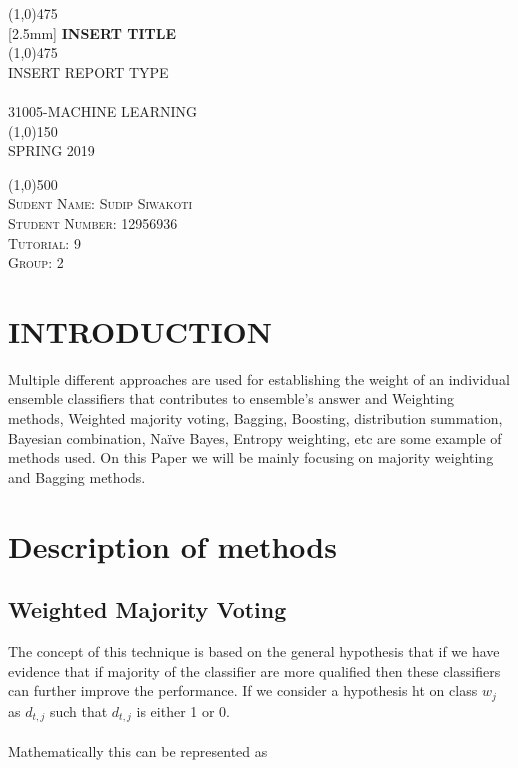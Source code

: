 \documentclass{article}
\begin{document}
\begin{titlepage}
	\begin{center}
    \line(1,0){475}\\
   [2.5mm]
    \huge{\bfseries INSERT TITLE}\\
    \line(1,0){475}\\
    [3mm]
    \textsc{\Large INSERT REPORT TYPE}\\
    [6cm]
    \textsc{\small \\
    [1mm]
    31005-MACHINE LEARNING\\
    \line(1,0){150}\\
    SPRING 2019}\\
    [6.cm]
    \end{center}
    \begin{flushleft}
    \line(1,0){500}\\
    \textsc{\large Sudent Name: Sudip Siwakoti \\Student Number: 12956936\\ Tutorial: 9 \\ Group: 2 }
    \end{flushleft}
    \lipsum[0]
\end{titlepage}
\tableofcontents
\thispagestyle{empty}
\cleardoublepage
\setcounter{page}{1}

\section{INTRODUCTION}\label{sec:intor}


Multiple different approaches are used for establishing the weight of an individual ensemble classifiers that contributes to ensemble’s answer and Weighting methods, Weighted majority voting, Bagging, Boosting, distribution summation, Bayesian combination, Naïve Bayes, Entropy weighting, etc are some example of methods used. On this Paper we will be mainly focusing on majority weighting and Bagging methods.
\section{Description of methods}
\subsection{Weighted Majority Voting}\label{SEC:Methods }
The concept of this technique is based on the general hypothesis that if we have evidence that if majority of the classifier are more qualified then these classifiers can further improve the performance. If we consider a hypothesis ht on class $w_j$ as $d_{t,j}$ such that $d_{t,j}$ is either 1 or 0.\\
\\
Mathematically this can be represented as
\end{document}
